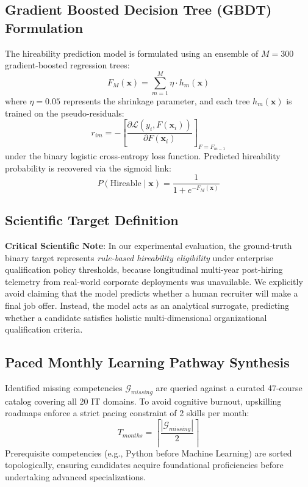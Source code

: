 \documentclass[conference]{IEEEtran}
\begin{document}
\subsection{Gradient Boosted Decision Tree (GBDT) Formulation}
The hireability prediction model is formulated using an ensemble of $M = 300$ gradient-boosted regression trees:
\begin{equation}
F_M(\mathbf{x}) = \sum_{m=1}^{M} \eta \cdot h_m(\mathbf{x})
\end{equation}
where $\eta = 0.05$ represents the shrinkage parameter, and each tree $h_m(\mathbf{x})$ is trained on the pseudo-residuals:
\begin{equation}
r_{im} = -\left[\frac{\partial \mathcal{L}(y_i, F(\mathbf{x}_i))}{\partial F(\mathbf{x}_i)}\right]_{F=F_{m-1}}
\end{equation}
under the binary logistic cross-entropy loss function. Predicted hireability probability is recovered via the sigmoid link:
\begin{equation}
P(\text{Hireable} \mid \mathbf{x}) = \frac{1}{1 + e^{-F_M(\mathbf{x})}}
\end{equation}

\subsection{Scientific Target Definition}
\textbf{Critical Scientific Note}: In our experimental evaluation, the ground-truth binary target represents \textit{rule-based hireability eligibility} under enterprise qualification policy thresholds, because longitudinal multi-year post-hiring telemetry from real-world corporate deployments was unavailable. We explicitly avoid claiming that the model predicts whether a human recruiter will make a final job offer. Instead, the model acts as an analytical surrogate, predicting whether a candidate satisfies holistic multi-dimensional organizational qualification criteria.

\subsection{Paced Monthly Learning Pathway Synthesis}
Identified missing competencies $\mathcal{G}_{missing}$ are queried against a curated 47-course catalog covering all 20 IT domains. To avoid cognitive burnout, upskilling roadmaps enforce a strict pacing constraint of 2 skills per month:
\begin{equation}
T_{months} = \left\lceil \frac{|\mathcal{G}_{missing}|}{2} \right\rceil
\end{equation}
Prerequisite competencies (e.g., Python before Machine Learning) are sorted topologically, ensuring candidates acquire foundational proficiencies before undertaking advanced specializations.
\end{document}
